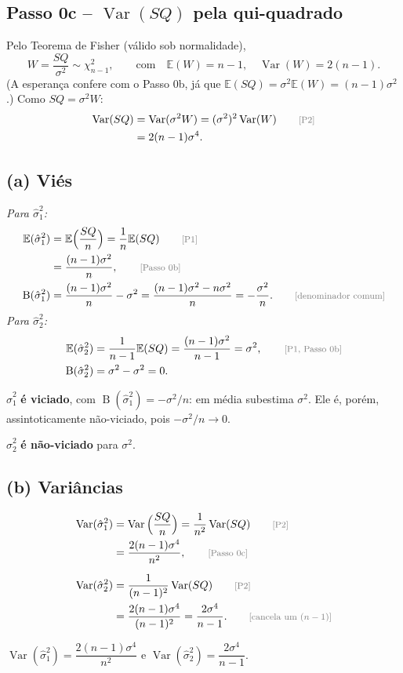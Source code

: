 \documentclass[11pt,a4paper]{article}
\newcommand{\E}{\mathbb{E}}
\newcommand{\Var}{\operatorname{Var}}
\newcommand{\B}{\operatorname{B}}
\newcommand{\just}[1]{\tag*{\footnotesize\textcolor{gray}{[#1]}}}
\begin{document}
\subsection*{Passo 0c -- $\Var(SQ)$ pela qui-quadrado}
Pelo Teorema de Fisher (válido sob normalidade),
\[
W=\frac{SQ}{\sigma^2}\sim\chi^2_{n-1},\qquad\text{com}\quad\E(W)=n-1,\quad\Var(W)=2(n-1).
\]
(A esperança confere com o Passo 0b, já que $\E(SQ)=\sigma^2\E(W)=(n-1)\sigma^2$.) Como $SQ=\sigma^2W$:
\begin{align*}
\Var(SQ)&=\Var(\sigma^2W)=(\sigma^2)^2\Var(W) \just{P2}\\
&=2(n-1)\sigma^4 .
\end{align*}

\subsection*{(a) Viés}
\textit{Para $\hat\sigma^2_1$:}
\begin{align*}
\E(\hat\sigma^2_1)&=\E\Big(\frac{SQ}{n}\Big)=\frac1n\E(SQ) \just{P1}\\
&=\frac{(n-1)\sigma^2}{n}, \just{Passo 0b}\\
\B(\hat\sigma^2_1)&=\frac{(n-1)\sigma^2}{n}-\sigma^2
=\frac{(n-1)\sigma^2-n\sigma^2}{n}=-\frac{\sigma^2}{n}. \just{denominador comum}
\end{align*}
\textit{Para $\hat\sigma^2_2$:}
\begin{align*}
\E(\hat\sigma^2_2)&=\frac1{n-1}\E(SQ)=\frac{(n-1)\sigma^2}{n-1}=\sigma^2, \just{P1, Passo 0b}\\
\B(\hat\sigma^2_2)&=\sigma^2-\sigma^2=0 .
\end{align*}
\begin{resposta}
$\hat\sigma^2_1$ \textbf{é viciado}, com $\B(\hat\sigma^2_1)=-\sigma^2/n$: em média subestima $\sigma^2$. Ele é, porém, assintoticamente não-viciado, pois $-\sigma^2/n\to0$.

$\hat\sigma^2_2$ \textbf{é não-viciado} para $\sigma^2$.
\end{resposta}

\subsection*{(b) Variâncias}
\begin{align*}
\Var(\hat\sigma^2_1)&=\Var\Big(\frac{SQ}{n}\Big)=\frac{1}{n^2}\Var(SQ) \just{P2}\\
&=\frac{2(n-1)\sigma^4}{n^2}, \just{Passo 0c}\\[6pt]
\Var(\hat\sigma^2_2)&=\frac{1}{(n-1)^2}\Var(SQ) \just{P2}\\
&=\frac{2(n-1)\sigma^4}{(n-1)^2}=\frac{2\sigma^4}{n-1}. \just{cancela um $(n-1)$}
\end{align*}
\begin{resposta}
$\Var(\hat\sigma^2_1)=\dfrac{2(n-1)\sigma^4}{n^2}$ \qquad e \qquad $\Var(\hat\sigma^2_2)=\dfrac{2\sigma^4}{n-1}$.
\end{resposta}
\end{document}
